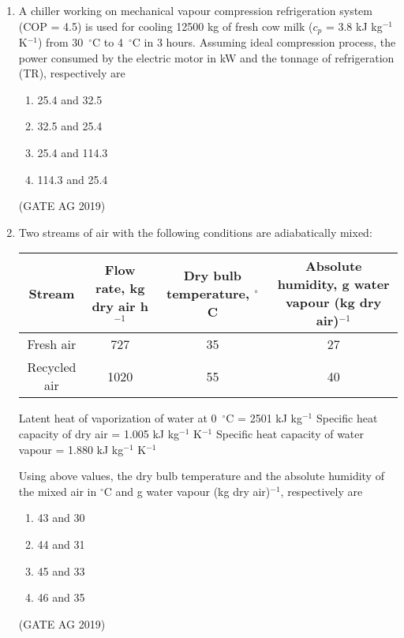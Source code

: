 \documentclass[journal,12pt,onecolumn]{IEEEtran}
\theoremstyle{remark}
\begin{document}
\begin{enumerate}
\item 
A chiller working on mechanical vapour compression refrigeration system (COP = 4.5) is used for cooling 12500 kg of fresh cow milk ($c_p$ = 3.8 kJ kg$^{-1}$ K$^{-1}$) from 30~$^\circ$C to 4~$^\circ$C in 3 hours. Assuming ideal compression process, the power consumed by the electric motor in kW and the tonnage of refrigeration (TR), respectively are  
\begin{multicols}{4}
\begin{enumerate}
\item 25.4 and 32.5
\item 32.5 and 25.4
\item 25.4 and 114.3
\item 114.3 and 25.4
\end{enumerate}
\end{multicols}
\hfill{(GATE AG 2019)}

\item 
Two streams of air with the following conditions are adiabatically mixed:  

\begin{center}
\begin{tabular}{|c|c|c|c|}
\hline
Stream & Flow rate, kg dry air h$^{-1}$ & Dry bulb temperature, $^\circ$C & Absolute humidity, g water vapour (kg dry air)$^{-1}$\\ 
\hline
Fresh air & 727 & 35 & 27 \\
Recycled air & 1020 & 55 & 40 \\
\hline
\end{tabular}
\end{center}

Latent heat of vaporization of water at 0~$^\circ$C = 2501 kJ kg$^{-1}$  
Specific heat capacity of dry air = 1.005 kJ kg$^{-1}$ K$^{-1}$  
Specific heat capacity of water vapour = 1.880 kJ kg$^{-1}$ K$^{-1}$  

Using above values, the dry bulb temperature and the absolute humidity of the mixed air in $^\circ$C and g water vapour (kg dry air)$^{-1}$, respectively are  
\begin{multicols}{4}
\begin{enumerate}
\item 43 and 30
\item 44 and 31
\item 45 and 33
\item 46 and 35
\end{enumerate}
\end{multicols}
\hfill{(GATE AG 2019)}


\end{enumerate}
\end{document}
